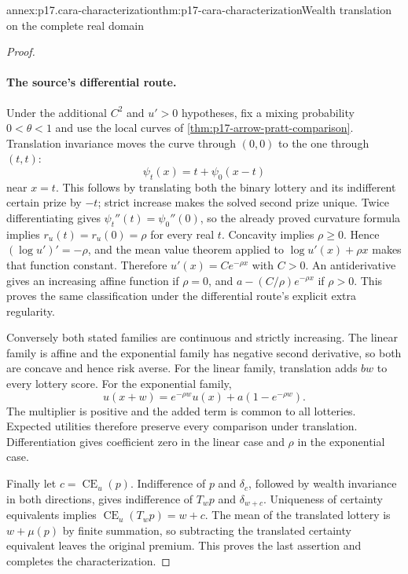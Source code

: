 \begin{annexitem}{annex:p17.cara-characterization}{thm:p17-cara-characterization}{Wealth translation on the complete real domain}
\begin{proof}
\paragraph{The source's differential route.}
Under the additional \(C^2\) and \(u'>0\) hypotheses, fix a mixing
probability \(0<\theta<1\) and use the local curves of
\cref{thm:p17-arrow-pratt-comparison}. Translation invariance moves
the curve through \((0,0)\) to the one through \((t,t)\):
\[
                          \psi_t(x)=t+\psi_0(x-t)
\]
near \(x=t\). This follows by translating both the binary lottery
and its indifferent certain prize by \(-t\); strict increase makes
the solved second prize unique. Twice differentiating gives
\(\psi_t''(t)=\psi_0''(0)\), so the already proved curvature formula
implies \(r_u(t)=r_u(0)=\rho\) for every real \(t\).
Concavity implies \(\rho\geq0\). Hence
\((\log u')'=-\rho\), and the mean value theorem applied to
\(\log u'(x)+\rho x\) makes that function constant. Therefore
\(u'(x)=C e^{-\rho x}\) with \(C>0\). An antiderivative gives
an increasing affine function if \(\rho=0\), and
\(a-(C/\rho)e^{-\rho x}\) if \(\rho>0\). This proves the same
classification under the differential route's explicit extra regularity.

Conversely both stated families are continuous and strictly increasing.
The linear family is affine and the exponential family has negative
second derivative, so both are concave and hence risk averse. For
the linear family, translation adds \(b w\) to every lottery score.
For the exponential family,
\[
             u(x+w)=e^{-\rho w}u(x)+a(1-e^{-\rho w}).
\]
The multiplier is positive and the added term is common to all
lotteries. Expected utilities therefore preserve every comparison
under translation. Differentiation gives coefficient zero in the
linear case and \(\rho\) in the exponential case.

Finally let \(c=\operatorname{CE}_u(p)\). Indifference of \(p\)
and \(\delta_c\), followed by wealth invariance in both directions,
gives indifference of \(T_wp\) and \(\delta_{w+c}\). Uniqueness of
certainty equivalents implies
\(\operatorname{CE}_u(T_wp)=w+c\). The mean of the translated lottery
is \(w+\mu(p)\) by finite summation, so subtracting the translated
certainty equivalent leaves the original premium. This proves the
last assertion and completes the characterization.
\end{proof}
\end{annexitem}
